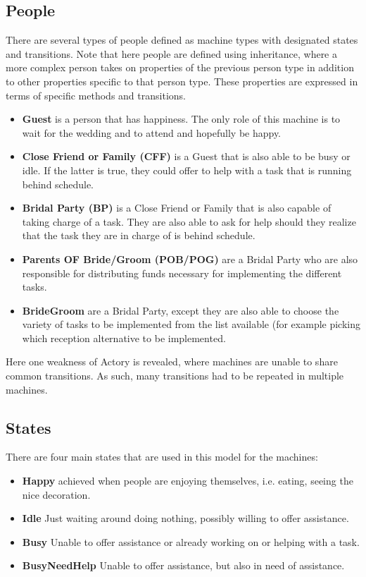 \documentclass{sig-alternate}
\newcommand{\bi}{\begin{itemize}}
\newcommand{\ei}{\end{itemize}}
\begin{document}
\subsection{People}
There are several types of people defined as machine types with designated states and transitions. Note that here people are defined using inheritance, where a more complex person takes on properties of the previous person type in addition to other properties specific to that person type. These properties are expressed in terms of specific methods and transitions.

\bi
\item \textbf{Guest} is a person that has happiness. The only role of this machine is to wait for the wedding and to attend and hopefully be happy.
\item \textbf{Close Friend or Family (CFF)} is a Guest that is also able to be busy or idle. If the latter is true, they could offer to help with a task that is running behind schedule.
\item \textbf{Bridal Party (BP)} is a Close Friend or Family that is also capable of taking charge of a task. They are also able to ask for help should they realize that the task they are in charge of is behind schedule.
\item \textbf{Parents OF Bride/Groom (POB/POG)} are a Bridal Party who are also responsible for distributing funds necessary for implementing the different tasks.
\item \textbf{BrideGroom} are a Bridal Party, except they are also able to choose the variety of tasks to be implemented from the list available (for example picking which reception alternative to be implemented.
\ei

Here one weakness of Actory is revealed, where machines are unable to share common transitions. As such, many transitions had to be repeated in multiple machines.

\subsection{States}
There are four main states that are used in this model for the machines:

\bi
\item \textbf{Happy} achieved when people are enjoying themselves, i.e. eating, seeing the nice decoration.
\item \textbf{Idle} Just waiting around doing nothing, possibly willing to offer assistance.
\item \textbf{Busy} Unable to offer assistance or already working on or helping with a task.
\item \textbf{BusyNeedHelp} Unable to offer assistance, but also in need of assistance.
\ei
\end{document}
